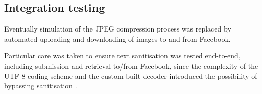 \subsection{Integration testing}

Eventually simulation of the JPEG compression process was replaced by automated uploading and downloading of images to and from Facebook.

Particular care was taken to ensure text sanitisation was tested end-to-end, including submission and retrieval to/from Facebook, since the complexity of the UTF-8 coding scheme and the custom built decoder introduced the possibility of bypassing sanitisation \cite{utf8}.
